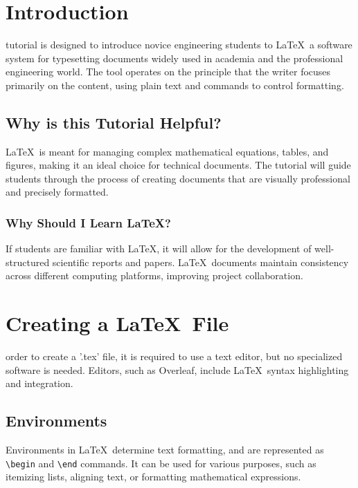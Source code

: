 \documentclass[12pt,journal,compsoc]{IEEEtran}
\begin{document}
\maketitle


\section{Introduction}

 tutorial is designed to introduce novice engineering students to \LaTeX\, a software system for typesetting documents widely used in academia and the professional engineering world. The tool operates on the principle that the writer focuses primarily on the content, using plain text and commands to control formatting.

\subsection{Why is this Tutorial Helpful?}
\LaTeX\ is meant for managing complex mathematical equations, tables, and figures, making it an ideal choice for technical documents. The tutorial will guide students through the process of creating documents that are visually professional and precisely formatted.

\subsubsection{Why Should I Learn \LaTeX{}?}
If students are familiar with \LaTeX, it will allow for the development of well-structured scientific reports and papers. \LaTeX\ documents maintain consistency across different computing platforms, improving project collaboration. 

\section{Creating a \LaTeX\ File}
 order to create a '.tex' file, it is required to use a text editor, but no specialized software is needed. Editors, such as Overleaf, include \LaTeX\ syntax highlighting and integration.

\subsection{Environments}
Environments in \LaTeX\ determine text formatting, and are represented as \texttt{\textbackslash begin} and \texttt{\textbackslash end} commands. It can be used for various purposes, such as itemizing lists, aligning text, or formatting mathematical expressions.
\end{document}
